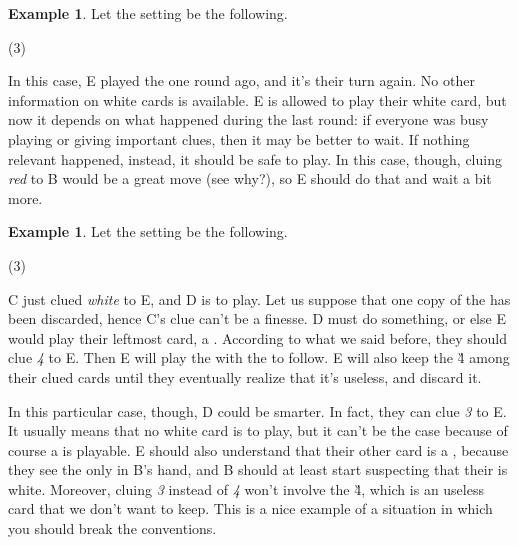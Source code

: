 \documentclass[a4paper]{article}
\theoremstyle{plain}
\theoremstyle{definition}
\newtheorem{example}[theorem]{Example}
\begin{document}
\begin{example}
	
	Let the setting be the following.
	
	\begin{tasks}(3)
		\task[+]      
		\task[A]    
		\task[B]    
		\task[C]    
		\task[D]    
		\task[E]    
	\end{tasks}
	
	In this case, E played the  one round ago, and it's their turn again. No other information on white cards is available. E is allowed to play their white card, but now it depends on what happened during the last round: if everyone was busy playing or giving important clues, then it may be better to wait. If nothing relevant happened, instead, it should be safe to play. In this case, though, cluing \textit{red} to B would be a great move (see why?), so E should do that and wait a bit more.
	
\end{example}

\begin{example}
	
	Let the setting be the following.
	
	\begin{tasks}(3)
		\task[+]      
		\task[A]    
		\task[B]    
		\task[C]    
		\task[D]    
		\task[E]    
	\end{tasks}
	
	C just clued \textit{white} to E, and D is to play. Let us suppose that one copy of the  has been discarded, hence C's clue can't be a finesse. D must do something, or else E would play their leftmost card, a . According to what we said before, they should clue \textit{4} to E. Then E will play the  with the  to follow. E will also keep the \G{4} among their clued cards until they eventually realize that it's useless, and discard it.
	
	In this particular case, though, D could be smarter. In fact, they can clue \textit{3} to E. It usually means that no white card is to play, but it can't be the case because of course a  is playable. E should also understand that their other card is a , because they see the only  in B's hand, and B should at least start suspecting that their  is white. Moreover, cluing \textit{3} instead of \textit{4} won't involve the \G{4}, which is an useless card that we don't want to keep. This is a nice example of a situation in which you should break the conventions.
	
\end{example}
\end{document}
